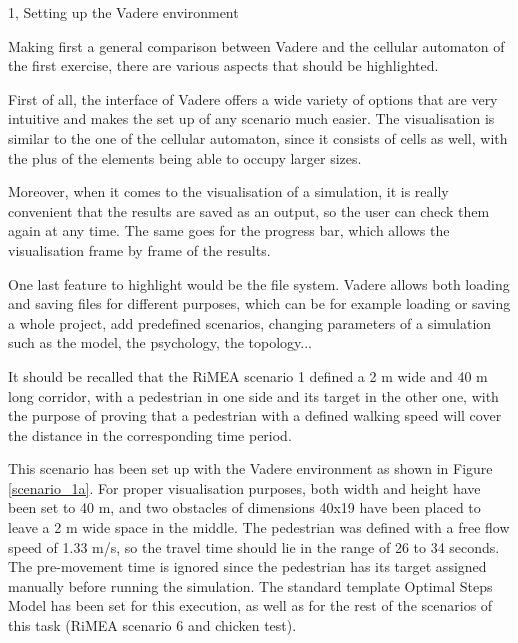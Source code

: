 \documentclass[10pt,a4paper]{article}
\begin{document}
\frontpage

\begin{task}{1, Setting up the Vadere environment}


Making first a general comparison between Vadere and the cellular automaton of the first exercise, there are various aspects that should be highlighted.

First of all, the interface of Vadere offers a wide variety of options that are very intuitive and makes the set up of any scenario much easier. The visualisation is similar to the one of the cellular automaton, since it consists of cells as well, with the plus of the elements being able to occupy larger sizes.

Moreover, when it comes to the visualisation of a simulation, it is really convenient that the results are saved as an output, so the user can check them again at any time. The same goes for the progress bar, which allows the visualisation frame by frame of the results.

One last feature to highlight would be the file system. Vadere allows both loading and saving files for different purposes, which can be for example loading or saving a whole project, add predefined scenarios, changing parameters of a simulation such as the model, the psychology, the topology...

\bigskip


It should be recalled that the RiMEA scenario 1 defined a 2 m wide and 40
m long corridor, with a pedestrian in one side and its target in the other one, with the purpose of proving that a pedestrian with a defined walking speed will cover the distance in the corresponding time period.

This scenario has been set up with the Vadere environment as shown in Figure \ref{scenario_1a}. For proper visualisation purposes, both width and height have been set to 40 m, and two obstacles of dimensions 40x19 have been placed to leave a 2 m wide space in the middle. The pedestrian was defined with a free flow speed of 1.33 m/s, so the travel time should lie in the range of 26 to 34 seconds. The pre-movement time is ignored since the pedestrian has its target assigned manually before running the simulation. The standard template Optimal Steps Model has been set for this execution, as well as for the rest of the scenarios of this task (RiMEA scenario 6 and chicken test).


\end{task}
\end{document}
